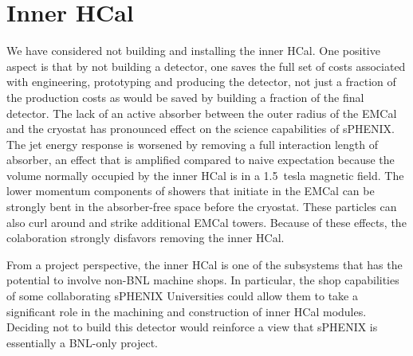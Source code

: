 \section*{Inner HCal}
\label{ihcal}

We have considered not building and installing the inner HCal.  One
positive aspect is that by not building a detector, one saves the full
set of costs associated with engineering, prototyping and producing
the detector, not just a fraction of the production costs as would be
saved by building a fraction of the final detector.  The lack of an
active absorber between the outer radius of the EMCal and the cryostat
has pronounced effect on the science capabilities of sPHENIX. The jet
energy response is worsened by removing a full interaction length of
absorber, an effect that is amplified compared to naive expectation
because the volume normally occupied by the inner HCal is in a
1.5~tesla magnetic field.  The lower momentum components of showers
that initiate in the EMCal can be strongly bent in the absorber-free
space before the cryostat.  These particles can also curl around and
strike additional EMCal towers.  Because of these effects, the
colaboration strongly disfavors removing the inner HCal.

From a project perspective, the inner HCal is one of the subsystems
that has the potential to involve non-BNL machine shops.  In
particular, the shop capabilities of some collaborating sPHENIX
Universities could allow them to take a significant role in the
machining and construction of inner HCal modules.  Deciding not to
build this detector would reinforce a view that sPHENIX is essentially
a BNL-only project.
